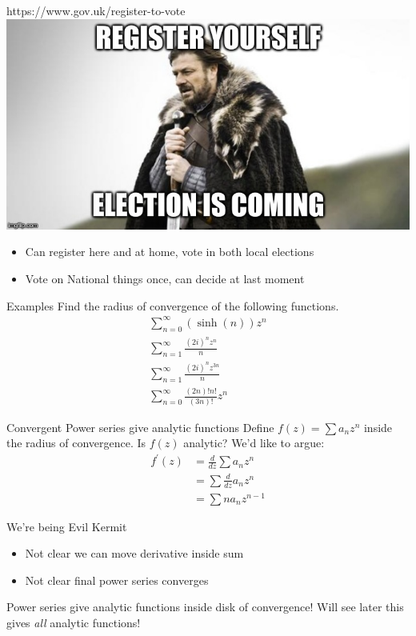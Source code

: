 \documentclass{beamer}
\begin{document}
\begin{frame}{https://www.gov.uk/register-to-vote}\includegraphics[width=\textwidth,height=0.8\textheight,keepaspectratio]{ElectionIsComing.jpg}\begin{itemize}
    \item Can register here and at home, vote in both local elections
    \item Vote on National things once, can decide at last moment
\end{itemize}
\end{frame}

\begin{frame}{Examples}
Find the radius of convergence of the following functions.
\begin{eqnarray}
\sum_{n=0}^\infty (\sinh(n))z^n \\
\sum_{n=1}^\infty \frac{(2i)^nz^n}{n} \\
\sum_{n=1}^\infty \frac{(2i)^nz^{3n}}{n} \\
\sum_{n=0}^\infty \frac{(2n)!n!}{(3n)!} z^n
\end{eqnarray}
    
    


\end{frame}


\begin{frame}{Convergent Power series give analytic functions}
Define $f(z)=\sum a_nz^n$ inside the radius of convergence.  Is $f(z)$ analytic?  We'd like to argue:
\begin{align*}f^\prime(z)&=\frac{d}{dz}\sum a_nz^n \\
&=\sum \frac{d}{dz} a_nz^n \\
&=\sum na_nz^{n-1}
\end{align*}
\begin{block}{We're being Evil Kermit}
\begin{itemize}
    \item Not clear we can move derivative inside sum
    \item Not clear final power series converges
\end{itemize}
\end{block}
\begin{block}{Power series give analytic functions inside disk of convergence!}
Will see later this gives \emph{all} analytic functions!
\end{block}
\end{frame}
\end{document}
